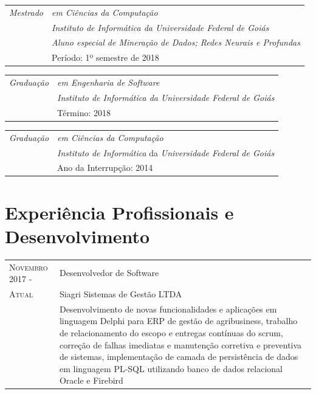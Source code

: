\documentclass[12pt, oneside, openany, a4paper, english, brazil]{abntex2}
\begin{document}
\begin{tabular}{p{2.2cm}|p{12cm}}
\emph{Mestrado}
& \emph{em Ciências da Computação} \\
& \emph{Instituto de Informática da Universidade Federal de Goiás} \\
& \emph{Aluno especial de Mineração de Dados; Redes Neurais e Profundas} \\
& Período: 1º semestre de 2018 \\
\end{tabular}

\begin{tabular}{p{2.2cm}|p{12cm}}
\emph{Graduação}
& \emph{em Engenharia de Software} \\
& \emph{Instituto de Informática da Universidade Federal de Goiás} \\
& Término: 2018\\
\end{tabular}

\begin{tabular}{p{2.2cm}|p{12cm}}
\emph{Graduação} & \emph{em Ciências da Computação}\\
& \emph{Instituto de Informática} da \emph{Universidade Federal de Goiás} \\
& Ano da Interrupção: 2014\\
\end{tabular}


\section{Experiência Profissionais e Desenvolvimento}

\begin{tabular}{p{3.5cm}p{11cm}}
\textsc{Novembro 2017} - & Desenvolvedor de Software \\
\textsc{Atual} & Siagri Sistemas de Gestão LTDA \\
\textsc{} & Desenvolvimento de novas funcionalidades e aplicações em linguagem Delphi para ERP de gestão de agribusiness, trabalho de relacionamento do escopo e entregas contínuas do scrum, correção de falhas imediatas e manutenção corretiva e preventiva de sistemas, implementação de camada de persistência de dados em linguagem PL-SQL utilizando banco de dados relacional Oracle e Firebird
\end{tabular}
\end{document}
